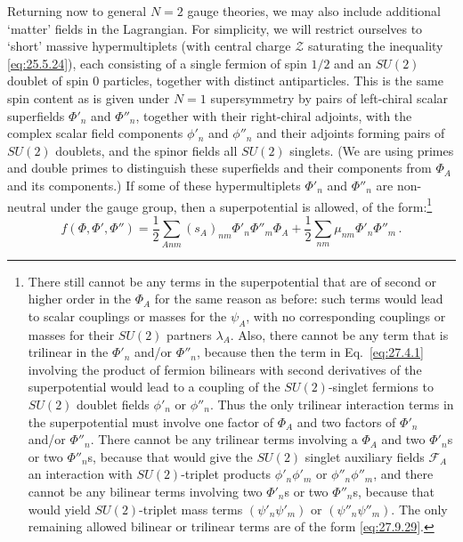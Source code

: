 Returning now to general \(N=2\) gauge theories, we may also include
additional `matter' fields in the Lagrangian. For simplicity, we will restrict
ourselves to `short' massive hypermultiplets (with central charge
\(\mathcal{Z}\) saturating the inequality \eqref{eq:25.5.24}), each consisting
of a single fermion of spin \(1/2\) and an \(SU(2)\) doublet of spin 0
particles, together with distinct antiparticles. This is the same spin
content as is given under \(N=1\) supersymmetry by pairs of left-chiral
scalar superfields \(\Phi'_n\) and \(\Phi''_n\), together with their
right-chiral adjoints, with the complex scalar field components \(\phi'_n\)
and \(\phi''_n\) and their adjoints forming pairs of \(SU(2)\) doublets, and
the spinor fields all \(SU(2)\) singlets. (We are using primes and double
primes to distinguish these superfields and their components from \(\Phi_A\)
and its components.) If some of these hypermultiplets \(\Phi'_n\) and
\(\Phi''_n\) are non-neutral under the gauge group, then a superpotential is
allowed, of the form:\footnote{There still cannot be any terms in the
superpotential that are of second or higher order in the \(\Phi_A\) for the
same reason as before: such terms would lead to scalar couplings or masses
for the \(\psi_A\), with no corresponding couplings or masses for their
\(SU(2)\) partners \(\lambda_A\). Also, there cannot be any term that is
trilinear in the \(\Phi'_n\) and/or \(\Phi''_n\), because then the term in
Eq.~\eqref{eq:27.4.1} involving the product of fermion bilinears with second
derivatives of the superpotential would lead to a coupling of the
\(SU(2)\)-singlet fermions to \(SU(2)\) doublet fields \(\phi'_n\) or
\(\phi''_n\). Thus the only trilinear interaction terms in the
superpotential must involve one factor of \(\Phi_A\) and two factors of
\(\Phi'_n\) and/or \(\Phi''_n\). There cannot be any trilinear terms
involving a \(\Phi_A\) and two \(\Phi'_n\)s or two \(\Phi''_n\)s, because
that would give the \(SU(2)\) singlet auxiliary fields \(\mathcal{F}_A\) an
interaction with \(SU(2)\)-triplet products \(\phi'_n\phi'_m\) or
\(\phi''_n\phi''_m\), and there cannot be any bilinear terms involving two
\(\Phi'_n\)s or two \(\Phi''_n\)s, because that would yield \(SU(2)\)-triplet
mass terms \((\psi'_n\psi'_m)\) or
\((\psi''_n\psi''_m)\). The only
remaining allowed bilinear or trilinear terms are of the form
\eqref{eq:27.9.29}.}
\begin{equation}
  f(\Phi,\Phi',\Phi'')
  =\frac12\sum_{Anm}(s_A)_{nm}\Phi'_n\Phi''_m\Phi_A
  +\frac12\sum_{nm}\mu_{nm}\Phi'_n\Phi''_m\,.
  \tag{27.9.29}\label{eq:27.9.29}
\end{equation}
